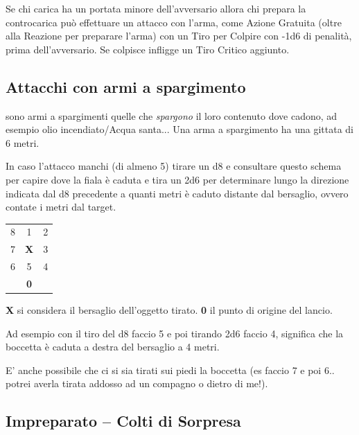 \begin{multicols}{2}
Se chi carica ha un portata minore dell'avversario allora chi prepara la controcarica può effettuare un attacco con l'arma, come Azione Gratuita (oltre alla Reazione per preparare l'arma) con un Tiro per Colpire con -1d6 di penalità, prima dell'avversario. Se colpisce infligge un Tiro Critico aggiunto.


%

\subsection{Attacchi con armi a spargimento} \label{attacchiarmidaspargimento}\hypertarget{spargimento}{}

sono armi a spargimenti quelle che \emph{spargono} il loro contenuto dove cadono, ad esempio olio incendiato/Acqua santa... Una arma a spargimento ha una gittata di 6 metri.

In caso l'attacco manchi (di almeno 5) tirare un d8 e consultare questo schema per capire dove la fiala è caduta e tira un 2d6 per determinare lungo la direzione indicata dal d8 precedente a quanti metri è caduto distante dal bersaglio, ovvero contate i metri dal target.

\medskip

\begin{tabular}{ccc}
	8& 1& 2\\
	7 &\textbf{X}& 3\\
	6 &5 &4\\
	&\textbf{0}&
\end{tabular}

\smallskip

\textbf{X} si considera il bersaglio dell'oggetto tirato. \textbf{0} il punto di origine del lancio.

Ad esempio con il tiro del d8 faccio 5 e poi tirando 2d6 faccio 4, significa che la boccetta è caduta a destra del bersaglio a 4 metri.

E' anche possibile che ci si sia tirati sui piedi la boccetta (es faccio 7 e poi 6.. potrei averla tirata addosso ad un compagno o dietro di me!).

\subsection{Impreparato -- Colti di Sorpresa}\label{coltidisorpresa}\hypertarget{sorpresa}{}


\end{multicols}
